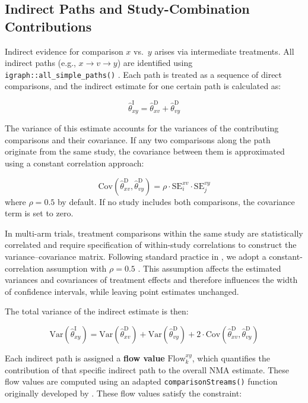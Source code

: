 \subsection{Indirect Paths and Study-Combination Contributions}

Indirect evidence for comparison $x$ vs.\ $y$ arises via intermediate treatments. All indirect paths (e.g., $x \rightarrow v \rightarrow y$) are identified using \texttt{igraph::all\_simple\_paths()} \citep{igraph2006, igraph2025}. Each path is treated as a sequence of direct comparisons, and the indirect estimate for one certain path is calculated as:

\[
\hat{\theta}^{\mathrm{I}}_{xy} = \hat{\theta}^{\mathrm{D}}_{xv} + \hat{\theta}^{\mathrm{D}}_{vy}
\]

The variance of this estimate accounts for the variances of the contributing comparisons and their covariance. If any two comparisons along the path originate from the same study, the covariance between them is approximated using a constant correlation approach:

\[
\mathrm{Cov}(\hat{\theta}^{\mathrm{D}}_{xv}, \hat{\theta}^{\mathrm{D}}_{vy}) = \rho \cdot \mathrm{SE}^{xv}_i \cdot \mathrm{SE}^{vy}_j
\] where $\rho = 0.5$ by default. If no study includes both comparisons, the covariance term is set to zero. 

In multi-arm trials, treatment comparisons within the same study are statistically correlated and require specification of within-study correlations to construct the variance--covariance matrix. Following standard practice in , we adopt a constant-correlation assumption with $\rho = 0.5$ \citep{LuAdes2006}. This assumption affects the estimated variances and covariances of treatment effects and therefore influences the width of confidence intervals, while leaving point estimates unchanged.

The total variance of the indirect estimate is then:

\[
\mathrm{Var}(\hat{\theta}^{\mathrm{I}}_{xy}) = \mathrm{Var}(\hat{\theta}^{\mathrm{D}}_{xv}) + \mathrm{Var}(\hat{\theta}^{\mathrm{D}}_{vy}) + 2 \cdot \mathrm{Cov}(\hat{\theta}^{\mathrm{D}}_{xv}, \hat{\theta}^{\mathrm{D}}_{vy})
\]

Each indirect path is assigned a \textbf{flow value} $\mathrm{Flow}^{xy}_k$, which quantifies the contribution of that specific indirect path to the overall NMA estimate. These flow values are computed using an adapted \texttt{comparisonStreams()} function originally developed by \citet{Papakonstantinou2018}. These flow values satisfy the constraint:

